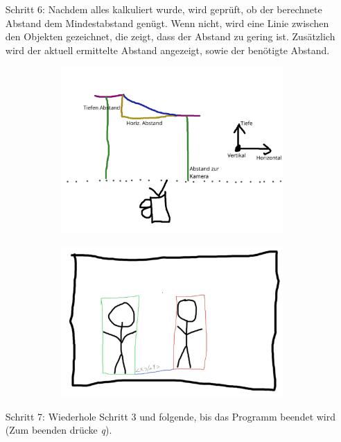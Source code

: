 \documentclass[12pt]{article}
\theoremstyle{definition}
\begin{document}
\begin{flushleft}
\begin{enumerate}
\item[Schritt 6:] Nachdem alles kalkuliert wurde, wird geprüft, ob der berechnete Abstand dem Mindestabstand genügt. Wenn nicht, wird eine Linie zwischen den Objekten gezeichnet, die zeigt, dass der Abstand zu gering ist. Zusätzlich wird der aktuell ermittelte Abstand angezeigt, sowie der benötigte Abstand.

\begin{figure}[h]
\begin{subfigure}[t]{0.5\textwidth}
	\centering
	\includegraphics[scale=0.45]{Abstand_kalk.jpg}
\end{subfigure}%
\begin{subfigure}[t]{0.5\textwidth}
	\centering
	\includegraphics[scale=0.25]{step3.png}
\end{subfigure}%
\end{figure}

\item[Schritt 7:] Wiederhole Schritt 3 und folgende, bis das Programm beendet wird (Zum beenden drücke \textit{q}).
\end{enumerate}
\end{flushleft}
\end{document}
